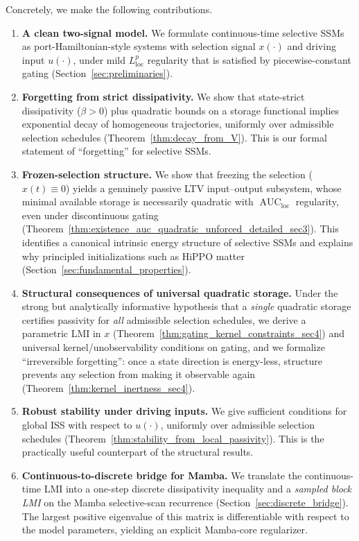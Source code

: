 \documentclass[10pt]{article} %
\newcommand{\loc}{\mathrm{loc}}                         %
\DeclareMathOperator{\AUC}{AUC}                         %
\theoremstyle{definition}
\begin{document}
Concretely, we make the following contributions.
\begin{enumerate}
    \item \textbf{A clean two-signal model.} We formulate continuous-time selective SSMs as port-Hamiltonian-style systems with selection signal $x(\cdot)$ and driving input $u(\cdot)$, under mild $L^p_{\loc}$ regularity that is satisfied by piecewise-constant gating (Section~\ref{sec:preliminaries}).
    \item \textbf{Forgetting from strict dissipativity.} We show that state-strict dissipativity ($\beta>0$) plus quadratic bounds on a storage functional implies exponential decay of homogeneous trajectories, uniformly over admissible selection schedules (Theorem~\ref{thm:decay_from_V}). This is our formal statement of ``forgetting'' for selective SSMs.
    \item \textbf{Frozen-selection structure.} We show that freezing the selection ($x(t)\equiv 0$) yields a genuinely passive LTV input--output subsystem, whose minimal available storage is necessarily quadratic with $\AUC_{\loc}$ regularity, even under discontinuous gating (Theorem~\ref{thm:existence_auc_quadratic_unforced_detailed_sec3}). This identifies a canonical intrinsic energy structure of selective SSMs and explains why principled initializations such as HiPPO \citep{gu2020hippo} matter (Section~\ref{sec:fundamental_properties}).
    \item \textbf{Structural consequences of universal quadratic storage.} Under the strong but analytically informative hypothesis that a \emph{single} quadratic storage certifies passivity for \emph{all} admissible selection schedules, we derive a parametric LMI in $x$ (Theorem~\ref{thm:gating_kernel_constraints_sec4}) and universal kernel/unobservability conditions on gating, and we formalize ``irreversible forgetting'': once a state direction is energy-less, structure prevents any selection from making it observable again (Theorem~\ref{thm:kernel_inertness_sec4}).
    \item \textbf{Robust stability under driving inputs.} We give sufficient conditions for global ISS with respect to $u(\cdot)$, uniformly over admissible selection schedules (Theorem~\ref{thm:stability_from_local_passivity}). This is the practically useful counterpart of the structural results.
    \item \textbf{Continuous-to-discrete bridge for Mamba.} We translate the continuous-time LMI into a one-step discrete dissipativity inequality and a \emph{sampled block LMI} on the Mamba selective-scan recurrence (Section~\ref{sec:discrete_bridge}). The largest positive eigenvalue of this matrix is differentiable with respect to the model parameters, yielding an explicit Mamba-core regularizer.

\end{enumerate}
\end{document}
